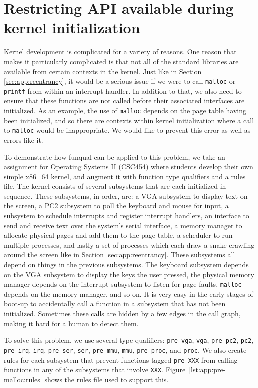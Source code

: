 \section{Restricting API available during kernel initialization}\label{sec:app:pre-malloc}

Kernel development is complicated for a variety of reasons.  One reason that makes it particularly complicated is that not all of the standard libraries are available from certain contexts in the kernel.  Just like in Section \ref{sec:app:reentrancy}, it would be a serious issue if we were to call \lstinline{malloc} or \lstinline{printf} from within an interrupt handler.  In addition to that, we also need to ensure that these functions are not called before their associated interfaces are initialized.  As an example, the use of \lstinline{malloc} depends on the page table having been initialized, and so there are contexts within kernel initialization where a call to \lstinline{malloc} would be inappropriate.  We would like to prevent this error as well as errors like it. 

To demonstrate how funqual can be applied to this problem, we take an assignment for Operating Systems II (CSC454) where students develop their own simple x86\_64 kernel, and augment it with function type qualifiers and a rules file.  The kernel consists of several subsystems that are each initialized in sequence.  These subsystems, in order, are: a VGA subsystem to display text on the screen, a PC2 subsystem to poll the keyboard and mouse for input, a subsystem to schedule interrupts and register interrupt handlers, an interface to send and receive text over the system's serial interface, a memory manager to allocate physical pages and add them to the page table, a scheduler to run multiple processes, and lastly a set of processes which each draw a snake crawling around the screen like in Section \ref{sec:app:reentrancy}.  These subsystems all depend on things in the previous subsystems.  The keyboard subsystem depends on the VGA subsystem to display the keys the user pressed, the physical memory manager depends on the interrupt subsystem to listen for page faults, \lstinline{malloc} depends on the memory manager, and so on.  It is very easy in the early stages of boot-up to accidentally call a function in a subsystem that has not been initialized.  Sometimes these calls are hidden by a few edges in the call graph, making it hard for a human to detect them.  

To solve this problem, we use several type qualifiers:  \lstinline{pre_vga}, \lstinline{vga}, \lstinline{pre_pc2}, \lstinline{pc2}, \lstinline{pre_irq}, \lstinline{irq}, \lstinline{pre_ser}, \lstinline{ser}, \lstinline{pre_mmu}, \lstinline{mmu}, \lstinline{pre_proc}, and \lstinline{proc}.  We also create rules for each subsystem that prevent functions tagged \lstinline{pre_XXX} from calling functions in any of the subsystems that involve \lstinline{XXX}.  Figure~\ref{lst:app:pre-malloc:rules} shows the rules file used to support this.  

